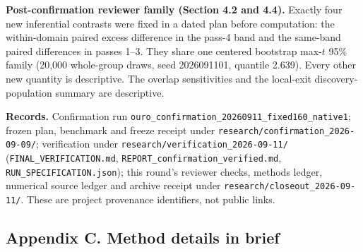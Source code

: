 \documentclass[
  british,
  11pt,
  a4paper,
]{article}
\begin{document}
\textbf{Post-confirmation reviewer family (Section 4.2 and 4.4).}
Exactly four new inferential contrasts were fixed in a dated plan before
computation: the within-domain paired excess difference in the pass-4
band and the same-band paired differences in passes 1--3. They share one
centered bootstrap max-\(t\) 95\% family (20,000 whole-group draws, seed
2026091101, quantile 2.639). Every other new quantity is descriptive.
The overlap sensitivities and the local-exit discovery-population
summary are descriptive.

\textbf{Records.} Confirmation run
\texttt{ouro\_confirmation\_20260911\_fixed160\_native1}; frozen plan,
benchmark and freeze receipt under
\texttt{research/confirmation\_2026-09-09/}; verification under
\texttt{research/verification\_2026-09-11/}
(\texttt{FINAL\_VERIFICATION.md},
\texttt{REPORT\_confirmation\_verified.md},
\texttt{RUN\_SPECIFICATION.json}); this round's reviewer checks, methods
ledger, numerical source ledger and archive receipt under
\texttt{research/closeout\_2026-09-11/}. These are project provenance
identifiers, not public links.

\subsection{Appendix C. Method details in
brief}\label{appendix-c.-method-details-in-brief}
\end{document}
